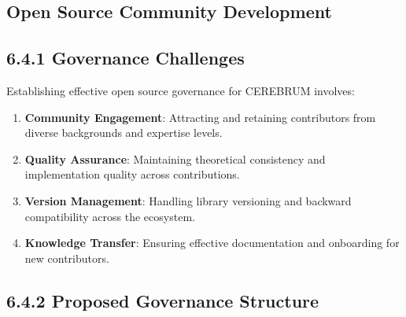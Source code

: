 \documentclass[
  11pt,
  letterpaper,
]{article}
\providecommand{\tightlist}{%
  \setlength{\itemsep}{0pt}\setlength{\parskip}{0pt}}
\begin{document}
\hypertarget{open-source-community-development}{%
\subsection{Open Source Community
Development}\label{open-source-community-development}}

\hypertarget{governance-challenges}{%
\subsection{6.4.1 Governance Challenges}\label{governance-challenges}}

Establishing effective open source governance for CEREBRUM involves:

\begin{enumerate}
\def\labelenumi{\arabic{enumi}.}
\tightlist
\item
  \textbf{Community Engagement}: Attracting and retaining contributors
  from diverse backgrounds and expertise levels.
\item
  \textbf{Quality Assurance}: Maintaining theoretical consistency and
  implementation quality across contributions.
\item
  \textbf{Version Management}: Handling library versioning and backward
  compatibility across the ecosystem.
\item
  \textbf{Knowledge Transfer}: Ensuring effective documentation and
  onboarding for new contributors.
\end{enumerate}

\hypertarget{proposed-governance-structure}{%
\subsection{6.4.2 Proposed Governance
Structure}\label{proposed-governance-structure}}
\end{document}
